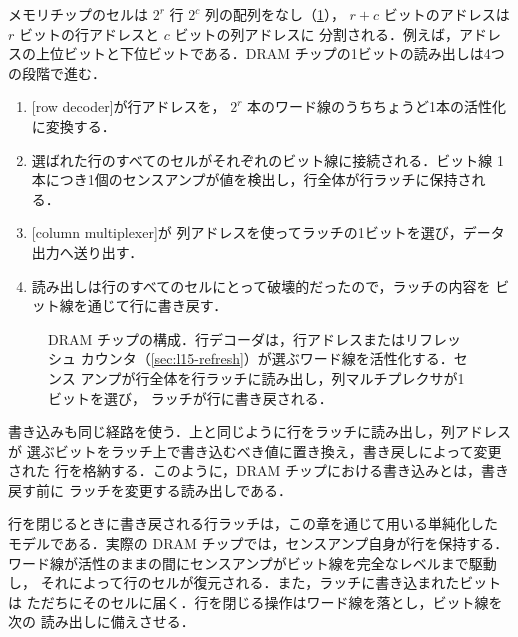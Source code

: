 \documentclass[../main.tex]{subfiles}
\begin{document}
メモリチップのセルは $2^r$ 行 $2^c$ 列の配列をなし（\cref{fig:l15-chip}），
$r+c$ ビットのアドレスは $r$ ビットの行アドレスと $c$ ビットの列アドレスに
分割される．例えば，アドレスの上位ビットと下位ビットである．DRAM チップの1ビットの読み出しは4つの段階で進む．
\begin{enumerate}
  \item {}[row decoder]が行アドレスを，
    $2^r$ 本のワード線のうちちょうど1本の活性化に変換する．
  \item 選ばれた行のすべてのセルがそれぞれのビット線に接続される．ビット線
    1本につき1個のセンスアンプが値を検出し，行全体が行ラッチに保持される．
  \item {}[column multiplexer]が
    列アドレスを使ってラッチの1ビットを選び，データ出力へ送り出す．
  \item 読み出しは行のすべてのセルにとって破壊的だったので，ラッチの内容を
    ビット線を通じて行に書き戻す．
\end{enumerate}

\begin{figure}[htbp]
  \centering
  
  \caption{DRAM チップの構成．行デコーダは，行アドレスまたはリフレッシュ
    カウンタ（\cref{sec:l15-refresh}）が選ぶワード線を活性化する．センス
    アンプが行全体を行ラッチに読み出し，列マルチプレクサが1ビットを選び，
    ラッチが行に書き戻される．}
  \label{fig:l15-chip}
\end{figure}

書き込みも同じ経路を使う．上と同じように行をラッチに読み出し，列アドレスが
選ぶビットをラッチ上で書き込むべき値に置き換え，書き戻しによって変更された
行を格納する．このように，DRAM チップにおける書き込みとは，書き戻す前に
ラッチを変更する読み出しである．

\begin{note}
  \label{note:l15-model}
  行を閉じるときに書き戻される行ラッチは，この章を通じて用いる単純化した
  モデルである．実際の DRAM チップでは，センスアンプ自身が行を保持する．
  ワード線が活性のままの間にセンスアンプがビット線を完全なレベルまで駆動し，
  それによって行のセルが復元される．また，ラッチに書き込まれたビットは
  ただちにそのセルに届く．行を閉じる操作はワード線を落とし，ビット線を次の
  読み出しに備えさせる．
\end{note}
\end{document}
